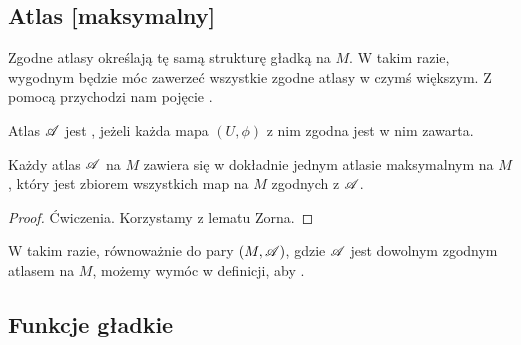 \subsection{Atlas [maksymalny]}

Zgodne atlasy określają tę samą strukturę gładką na $M$. W takim razie, wygodnym będzie móc zawerzeć wszystkie zgodne atlasy w czymś większym. Z pomocą przychodzi nam pojęcie .
\begin{definition}
    Atlas $\mathcal{A}$ jest , jeżeli każda mapa $(U,\phi)$ z nim zgodna jest w nim zawarta.
\end{definition}

%
%
%
%

\begin{fact}
    Każdy atlas $\mathcal{A}$ na $M$ zawiera się w dokładnie jednym atlasie maksymalnym na $M$, który jest zbiorem wszystkich map na $M$ zgodnych z $\mathcal{A}$.
\begin{proof}
Ćwiczenia. Korzystamy z lematu Zorna.
\end{proof}
\end{fact}

W takim razie, równoważnie do pary $(M, \mathcal{A})$, gdzie $\mathcal{A}$ jest dowolnym zgodnym atlasem na $M$, możemy wymóc w definicji, aby .

\subsection{Funkcje gładkie}

